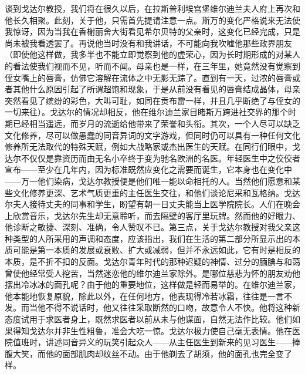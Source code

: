 \par 谈到戈达尔教授，我们将在很久以后，在拉斯普利埃宫堡维尔迪兰夫人府上再次和他长久相聚。此刻，关于他，只需首先提请注意一点。斯万的变化严格说来无法使我惊讶，因为当我在香榭丽舍大街看见希尔贝特的父亲时，这变化已经完成，只是尚未被我看透罢了。再说他当时没有和我讲话，不可能向我吹嘘他那些政界朋友（即使他这样做，我多半也不能立即觉察到他的虚荣心，因为长时期形成的对某人的看法使我们视而不见，听而不闻。母亲也是一样，在三年里，她竟然没有觉察到侄女嘴上的唇膏，仿佛它溶解在流体之中无影无踪了。直到有一天，过浓的唇膏或者其他什么原因引起了所谓超饱和现象，于是从前没有看见的唇膏结成晶体，母亲突然看见了缤纷的彩色，大叫可耻，如同在贡布雷一样，并且几乎断绝了与侄女的一切来往）。戈达尔的情况却相反，他在维尔迪兰家目睹斯万跨进社交界的那个时期已经相当遥远，而岁月的流逝给他带来了荣誉和头衔。其次，一个人尽可以缺乏文化修养，尽可以做愚蠢的同音异词的文字游戏，但同时仍可以具有一种任何文化修养所无法取代的特殊天赋，例如大战略家或杰出医生的天赋。在同行们眼中，戈达尔不仅仅是靠资历而由无名小卒终于变为驰名欧洲的名医。年轻医生中之佼佼者宣布——至少在几年内，因为标准既然应变化之需要而诞生，它本身也在变化中——万一他们染病，戈达尔教授便是他们唯一能以命相托的人。当然他们愿意和某些文化修养更深、艺术气质更重的主任医生交往，和他们谈论尼采和瓦格纳。戈达尔夫人接待丈夫的同事和学生，盼望有朝一日丈夫能当上医学院院长。人们在晚会上欣赏音乐，戈达尔先生却无意聆听，而去隔壁的客厅里玩牌。然而他的好眼力、他诊断之敏捷、深刻、准确，令人赞叹不已。第三点，关于戈达尔教授对我父亲这种类型的人所采用的声调和态度，应该指出，我们在生活的第二部分所显示出的本质可能是第一本质的发展或衰败、扩大或减弱，但并不永远如此，它有时是相反的本质，是不折不扣的反面。戈达尔青年时代的那种迟疑的神情、过分的腼腆与和蔼曾使他经常受人挖苦，当然迷恋他的维尔迪兰家除外。是哪位慈悲为怀的朋友劝他摆出冷冰冰的面孔呢？由于他的重要地位，这样做是轻而易举的。在维尔迪兰家，他本能地恢复原貌，除此以外，在任何地方，他表现得冷若冰霜，往往是一言不发。而当他不得不说话时，他又往往采取断然的口吻，故意令人不快。他将这种新态度试用于求医者身上，既然求医者以前从未与他谋面，自然无法作比较。他们如果得知戈达尔并非生性粗鲁，准会大吃一惊。戈达尔极力使自己毫无表情。他在医院值班时，讲述同音异义的玩笑引起众人——从主任医生到新来的见习医生——捧腹大笑，而他的面部肌肉却纹丝不动。由于他剃去了胡须，他的面孔也完全变了样。
